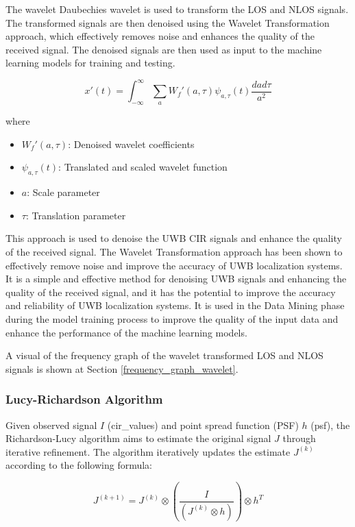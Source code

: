 The wavelet Daubechies wavelet is used to transform the LOS and NLOS signals. The transformed signals are then denoised using the Wavelet Transformation approach, which effectively removes noise and enhances the quality of the received signal. The denoised signals are then used as input to the machine learning models for training and testing.

\begin{equation}
x'(t) = \int_{-\infty}^{\infty} \sum_{a} W_f'(a, \tau) \psi_{a, \tau}(t) \frac{da d\tau}{a^2}
\end{equation}

where 

\begin{itemize}
  \item $W_f'(a, \tau)$: Denoised wavelet coefficients
  \item $\psi_{a, \tau}(t)$: Translated and scaled wavelet function
  \item $a$: Scale parameter
  \item $\tau$: Translation parameter
\end{itemize}

This approach is used to denoise the UWB CIR signals and enhance the quality of the received signal. The Wavelet Transformation approach has been shown to effectively remove noise and improve the accuracy of UWB localization systems. It is a simple and effective method for denoising UWB signals and enhancing the quality of the received signal, and it has the potential to improve the accuracy and reliability of UWB localization systems. It is used in the Data Mining phase during the model training process to improve the quality of the input data and enhance the performance of the machine learning models.

A visual of the frequency graph of the wavelet transformed LOS and NLOS signals is shown at Section \ref{frequency_graph_wavelet}.

\subsubsection{Lucy-Richardson Algorithm}

Given observed signal $I$ (cir\_values) and point spread function (PSF) $h$ (psf), the Richardson-Lucy algorithm aims to estimate the original signal $J$ through iterative refinement. The algorithm iteratively updates the estimate $J^{(k)}$ according to the following formula:

\begin{equation}
J^{(k+1)} = J^{(k)} \otimes \left( \frac{I}{(J^{(k)} \otimes h)} \right) \otimes h^T
\end{equation}

